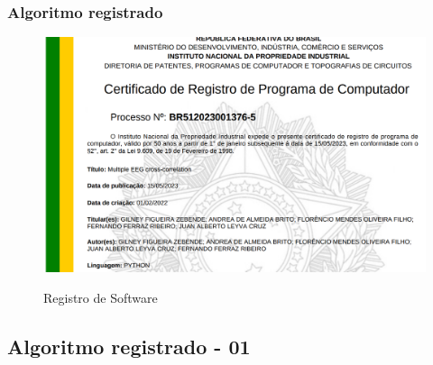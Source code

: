 \documentclass[11pt, aspectratio=169]{beamer}
\begin{document}

\begin{frame}
  \frametitle{Algoritmo registrado}

  \begin{figure}[!htb]
    \centering
    \caption{Registro de Software}
    \includegraphics[height=.6\paperheight]{../Figures/artigos_publicados/certificado_alg_01.png}
    \label{fig:alg_pub_01}
  \end{figure}

\end{frame}


\subsection{Algoritmo registrado - 01}
\end{document}
